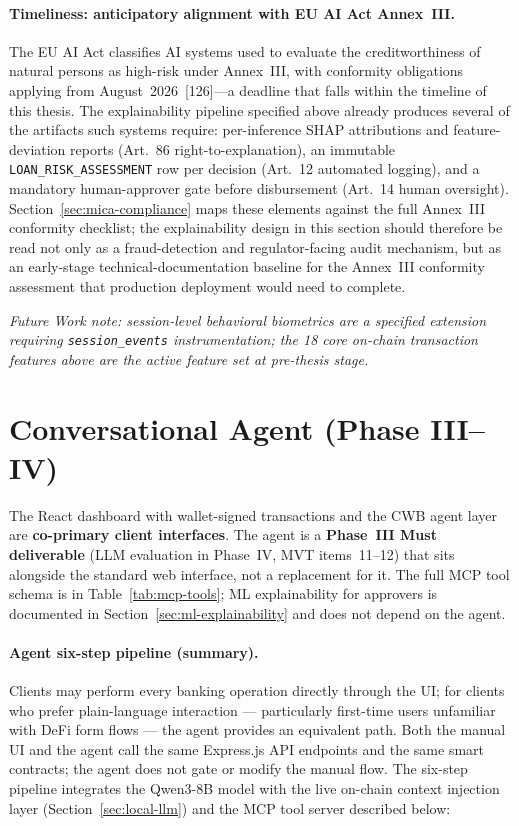 \documentclass[12pt,a4paper]{report}
\begin{document}
\paragraph{Timeliness: anticipatory alignment with EU AI Act Annex~III.}
The EU AI Act classifies AI systems used to evaluate the creditworthiness
of natural persons as high-risk under Annex~III, with conformity
obligations applying from August~2026~[126]---a deadline that falls
within the timeline of this thesis. The explainability pipeline specified
above already produces several of the artifacts such systems require:
per-inference SHAP attributions and feature-deviation reports (Art.~86
right-to-explanation), an immutable \texttt{LOAN\_RISK\_ASSESSMENT} row per
decision (Art.~12 automated logging), and a mandatory human-approver gate
before disbursement (Art.~14 human oversight). Section~\ref{sec:mica-compliance}
maps these elements against the full Annex~III conformity checklist; the
explainability design in this section should therefore be read not only
as a fraud-detection and regulator-facing audit mechanism, but as an
early-stage technical-documentation baseline for the Annex~III conformity
assessment that production deployment would need to complete.

\noindent\textit{Future Work note: session-level behavioral biometrics are a specified extension requiring \texttt{session\_events} instrumentation; the 18 core on-chain transaction features above are the active feature set at pre-thesis stage.}

\section{Conversational Agent (Phase III--IV)}
\label{sec:optional-agent}

The React dashboard with wallet-signed transactions and the CWB agent layer are \textbf{co-primary client interfaces}. The agent is a \textbf{Phase~III Must deliverable} (LLM evaluation in Phase~IV, MVT items~11--12) that sits alongside the standard web interface, not a replacement for it. The full MCP tool schema is in Table~\ref{tab:mcp-tools}; ML explainability for approvers is documented in Section~\ref{sec:ml-explainability} and does not depend on the agent.

\paragraph{Agent six-step pipeline (summary).} Clients may perform every banking operation directly through the UI; for clients who prefer plain-language interaction --- particularly first-time users unfamiliar with DeFi form flows --- the agent provides an equivalent path. Both the manual UI and the agent call the same Express.js API endpoints and the same smart contracts; the agent does not gate or modify the manual flow. The six-step pipeline integrates the Qwen3-8B model with the live on-chain context injection layer (Section~\ref{sec:local-llm}) and the MCP tool server described below:
\end{document}
